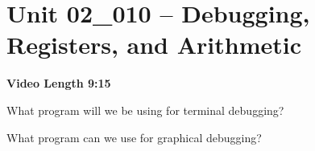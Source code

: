 \documentclass[letterpaper,12pt]{exam}
\newcommand{\unit}{Unit 02}
\begin{document}
\section*{\unit\_010 -- Debugging, Registers, and Arithmetic} 
\par{\selectfont\textbf{Video Length 9:15 }}
\begin{questions}

\begin{samepage}
    \question What program will we be using for terminal debugging?
    \vspace{5mm}
\end{samepage}
\par
 \begin{samepage}
     \question What program can we use for graphical debugging?
     \vspace{5mm}
 \end{samepage}
 \par
  

\end{questions}
\end{document}
